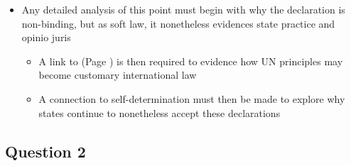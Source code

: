 \begin{itemize}
    \item Any detailed analysis of this point must begin with why the declaration is non-binding, but as soft law, it nonetheless evidences state practice and \gls{opinio juris}
    \begin{itemize}
        \item A link to  (Page \pageref{case:Horta v Commonwealth}) is then required to evidence how UN principles may become customary international law
        \item A connection to self-determination must then be made to explore why states continue to nonetheless accept these declarations
    \end{itemize}
\end{itemize}

\subsection*{Question 2}
